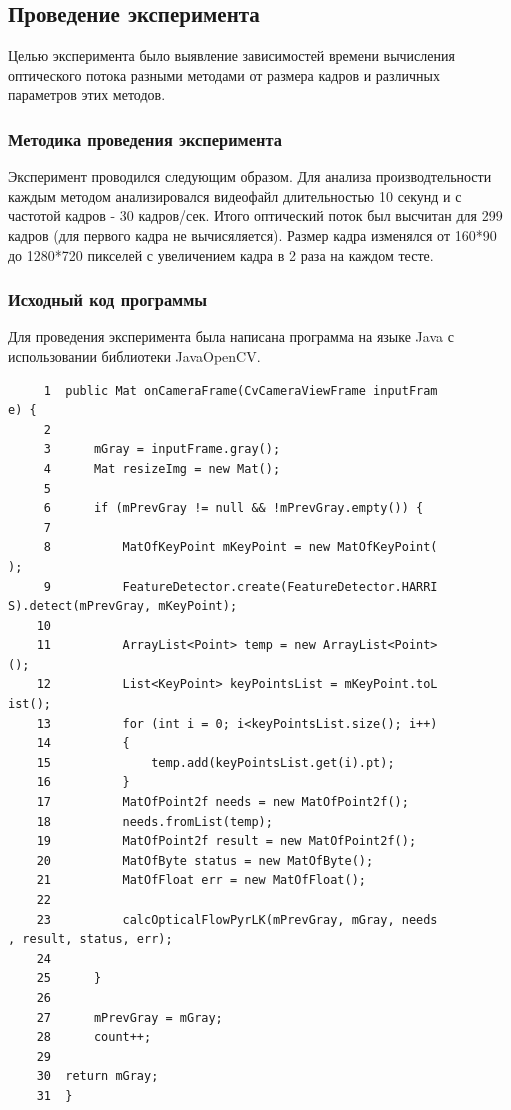\subsection{Проведение эксперимента}

Целью эксперимента было выявление зависимостей времени вычисления оптического потока разными методами от размера кадров и различных параметров этих методов.

\subsubsection{Методика проведения эксперимента}
Эксперимент проводился следующим образом.
Для анализа производтельности каждым методом анализировался видеофайл длительностью 10 секунд и с частотой кадров - 30 кадров/сек. Итого оптический поток был высчитан для 299 кадров (для первого кадра не вычисяляется). Размер кадра изменялся от 160*90 до 1280*720 пикселей с увеличением кадра в 2 раза на каждом тесте.

\subsubsection{Исходный код программы}
Для проведения эксперимента была написана программа на языке Java с использовании библиотеки JavaOpenCV. 

\begin{verbatim}
     1	public Mat onCameraFrame(CvCameraViewFrame inputFram
e) {
     2	   
     3	    mGray = inputFrame.gray();
     4	    Mat resizeImg = new Mat();
     5	
     6	    if (mPrevGray != null && !mPrevGray.empty()) {
     7	       
     8	        MatOfKeyPoint mKeyPoint = new MatOfKeyPoint(
);
     9	        FeatureDetector.create(FeatureDetector.HARRI
S).detect(mPrevGray, mKeyPoint);
    10	
    11	        ArrayList<Point> temp = new ArrayList<Point>
();
    12	        List<KeyPoint> keyPointsList = mKeyPoint.toL
ist();
    13	        for (int i = 0; i<keyPointsList.size(); i++)
    14	        {
    15	            temp.add(keyPointsList.get(i).pt);
    16	        }
    17	        MatOfPoint2f needs = new MatOfPoint2f();
    18	        needs.fromList(temp);
    19	        MatOfPoint2f result = new MatOfPoint2f();
    20	        MatOfByte status = new MatOfByte();
    21	        MatOfFloat err = new MatOfFloat();
    22	
    23	        calcOpticalFlowPyrLK(mPrevGray, mGray, needs
, result, status, err);
    24	
    25	    }
    26	
    27	    mPrevGray = mGray;
    28	    count++;
    29	
    30	return mGray;
    31	}

\end{verbatim}

